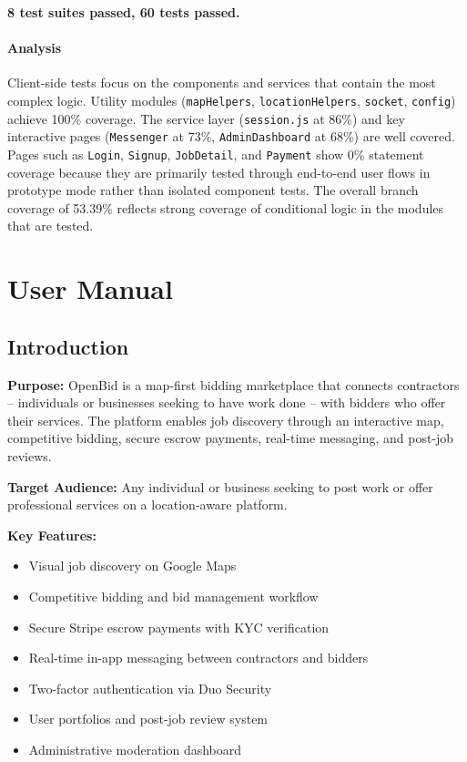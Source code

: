 \documentclass[11pt]{article}
\begin{document}
\textbf{8 test suites passed, 60 tests passed.}

\paragraph{Analysis}
Client-side tests focus on the components and services that contain the most
complex logic. Utility modules (\texttt{mapHelpers}, \texttt{locationHelpers},
\texttt{socket}, \texttt{config}) achieve 100\% coverage. The service layer
(\texttt{session.js} at 86\%) and key interactive pages (\texttt{Messenger} at
73\%, \texttt{AdminDashboard} at 68\%) are well covered. Pages such as
\texttt{Login}, \texttt{Signup}, \texttt{JobDetail}, and \texttt{Payment} show
0\% statement coverage because they are primarily tested through end-to-end
user flows in prototype mode rather than isolated component tests. The overall
branch coverage of 53.39\% reflects strong coverage of conditional logic in the
modules that are tested.

\newpage

\section{User Manual}

\subsection{Introduction}

\textbf{Purpose:}
OpenBid is a map-first bidding marketplace that connects contractors -- individuals or
businesses seeking to have work done -- with bidders who offer their services. The
platform enables job discovery through an interactive map, competitive bidding,
secure escrow payments, real-time messaging, and post-job reviews.

\textbf{Target Audience:}
Any individual or business seeking to post work or offer professional services on a
location-aware platform.

\textbf{Key Features:}
\begin{itemize}[leftmargin=1.4em]
  \item Visual job discovery on Google Maps
  \item Competitive bidding and bid management workflow
  \item Secure Stripe escrow payments with KYC verification
  \item Real-time in-app messaging between contractors and bidders
  \item Two-factor authentication via Duo Security
  \item User portfolios and post-job review system
  \item Administrative moderation dashboard
\end{itemize}
\end{document}
